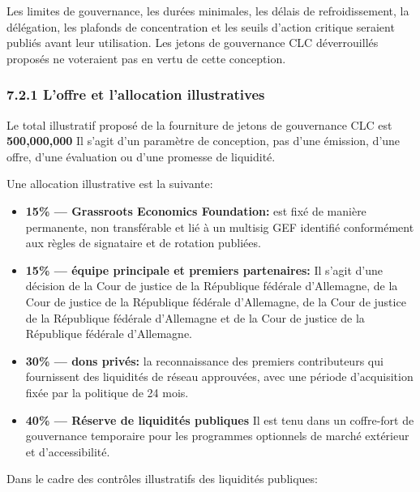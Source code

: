 \documentclass[11pt]{article}
\begin{document}
Les limites de gouvernance, les durées minimales, les délais de refroidissement, la délégation, les plafonds de concentration et les seuils d'action critique seraient publiés avant leur utilisation. Les jetons de gouvernance CLC déverrouillés proposés ne voteraient pas en vertu de cette conception.

\subsubsection*{7.2.1 L'offre et l'allocation illustratives}

Le total illustratif proposé de la fourniture de jetons de gouvernance CLC est \textbf{500,000,000} Il s'agit d'un paramètre de conception, pas d'une émission, d'une offre, d'une évaluation ou d'une promesse de liquidité.

Une allocation illustrative est la suivante:

\begin{itemize}[leftmargin=*]
\item \textbf{15\% --- Grassroots Economics Foundation:} est fixé de manière permanente, non transférable et lié à un multisig GEF identifié conformément aux règles de signataire et de rotation publiées.
\item \textbf{15\% --- équipe principale et premiers partenaires:} Il s'agit d'une décision de la Cour de justice de la République fédérale d'Allemagne, de la Cour de justice de la République fédérale d'Allemagne, de la Cour de justice de la République fédérale d'Allemagne et de la Cour de justice de la République fédérale d'Allemagne.
\item \textbf{30\% --- dons privés:} la reconnaissance des premiers contributeurs qui fournissent des liquidités de réseau approuvées, avec une période d'acquisition fixée par la politique de 24 mois.
\item \textbf{40\% --- Réserve de liquidités publiques} Il est tenu dans un coffre-fort de gouvernance temporaire pour les programmes optionnels de marché extérieur et d'accessibilité.
\end{itemize}
Dans le cadre des contrôles illustratifs des liquidités publiques:
\end{document}
